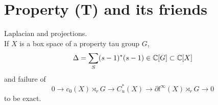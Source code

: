 \section{Property (T) and its friends}

Laplacian and projections.\\
If $X$ is a box space of a property tau group $G$,
\[\Delta = \sum_S (s-1)^*(s-1) \in \mathbb C [G] \subset \mathbb C[X]\]
and failure of 
\[ 0 \rightarrow c_0(X)\rtimes_r G \rightarrow C^*_u(X) \rightarrow \partial l^\infty (X)\rtimes_r G \rightarrow 0\]
to be exact.
